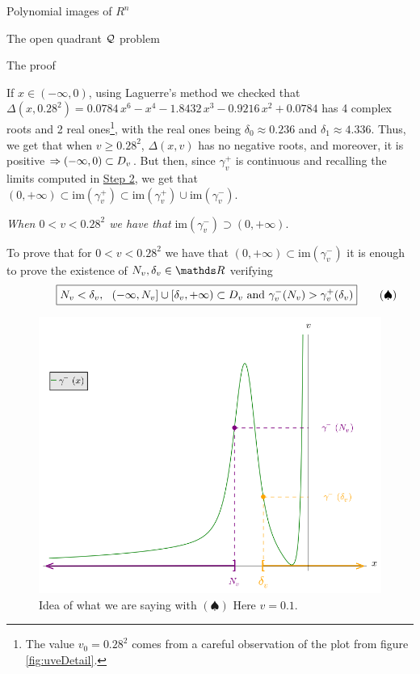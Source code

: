 \documentclass[11pt, a4paper, english, twoside, notitlepage]{report}
\begin{document}
\begin{chapter}{Polynomial images of $R^n$}
\begin{section}{The open quadrant $\mathcal{Q}$ problem}
\begin{subsection}{The proof}
\begin{Proof}
			If $x \in (-\infty, 0)$, using Laguerre's method we checked that $\Delta(x, 0.28^2)= 0.0784 \, x^{6} - x^{4} - 1.8432 \, x^{3} - 0.9216 \, x^{2} + 0.0784$ has 4 complex roots and 2 real ones\footnote{The value $v_0 = 0.28^2 $ comes from a careful observation of the plot from figure \ref{fig:uveDetail}.}, with the real ones being $\delta_0 \approx 0.236$ and $\delta_1 \approx 4.336$. Thus, we get that when $v \ge 0.28^2$, $\Delta(x, v)$ has no negative roots, and moreover, it is positive $\Rightarrow (-\infty, 0) \subset D_v$. But then, since $\gamma_v^+$ is continuous and recalling the limits computed in \hyperref[step2]{Step 2}, we get that $(0, +\infty) \subset \text{im}(\gamma_v^+) \subset \text{im}(\gamma_v^+) \cup \text{im}(\gamma_v^-)$.
			
			\begin{center}
				 \emph{When $0 < v < 0.28^2$ we have that} $\text{im}(\gamma_v^-) \supset (0, +\infty)$.
			\end{center}\label{step4}
			
			To prove that for $0 < v < 0.28^2$ we have that $(0, +\infty) \subset \text{im}(\gamma_v^-)$ it is enough to prove the existence of $N_v, \delta_v\in \R$ verifying			
			\begin{equation*}\qquad \quad
				\boxed{
					 N_v < \delta_v,\ \ (-\infty, N_v] \cup [\delta_v, +\infty) \subset D_v \text{ and } \gamma_v^-(N_v) > \gamma_v^+(\delta_v)\\
				}\qquad (\spadesuit)
			\end{equation*}
			
			\begin{figure}[h]
				\centering
				\includegraphics[width=1\textwidth]{plots/ch1_12_idea.png}
				\caption{Idea of what we are saying with $(\spadesuit)$ Here $v = 0.1$.\label{fig:idea}}
			\end{figure}
			

\end{Proof}
\end{subsection}
\end{section}
\end{chapter}
\end{document}
